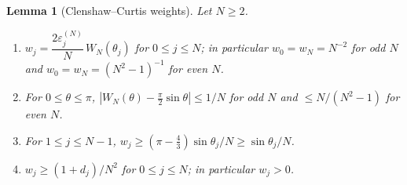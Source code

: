 \documentclass[preprint,12pt,a4paper]{elsarticle}
\newtheorem{lemma}[theorem]{Lemma}
\theoremstyle{remark}
\begin{document}
\begin{lemma}[Clenshaw--Curtis weights]\label{lem:weight-comparison}
Let $N\ge2$.
\begin{enumerate}
\item[(i)] $w_j=\dfrac{2\varepsilon^{(N)}_j}{N}\,W_N(\theta_j)$ for
 $0\le j\le N$; in particular $w_0=w_N=N^{-2}$ for odd $N$ and
 $w_0=w_N=(N^2-1)^{-1}$ for even $N$.
\item[(ii)] For $0\le\theta\le\pi$,
 $|W_N(\theta)-\tfrac\pi2\sin\theta|\le1/N$ for odd $N$ and
 $\le N/(N^2-1)$ for even $N$.
\item[(iii)] For $1\le j\le N-1$,
 $w_j\ge(\pi-\tfrac43)\sin\theta_j/N\ge\sin\theta_j/N$.
\item[(iv)] $w_j\ge(1+d_j)/N^2$ for $0\le j\le N$; in particular
 $w_j>0$.
\end{enumerate}
\end{lemma}
\end{document}
